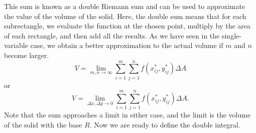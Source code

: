\documentclass{report}
\begin{document}
\begin{itemize}
            This sum is known as a double Riemann sum and can be used to approximate the value of the volume of the solid. Here, the double sum means that for each subrectangle, we evaluate the function at the chosen point, multiply by the area of each rectangle, and then add all the results.
            \bigbreak \noindent 
            As we have seen in the single-variable case, we obtain a better approximation to the actual volume if $m$ and $n$ become larger.
            \[ V = \lim_{m,n \to \infty} \sum_{i=1}^{m}\sum_{j=1}^{n} f(x^*_{ij}, y^*_{ij})\Delta A \]
            or
            \[ V = \lim_{\Delta x, \Delta y \to 0} \sum_{i=1}^{m}\sum_{j=1}^{n} f(x^*_{ij}, y^*_{ij})\Delta A. \]
            Note that the sum approaches a limit in either case, and the limit is the volume of the solid with the base $R$. Now we are ready to define the double integral.


\end{itemize}
\end{document}
